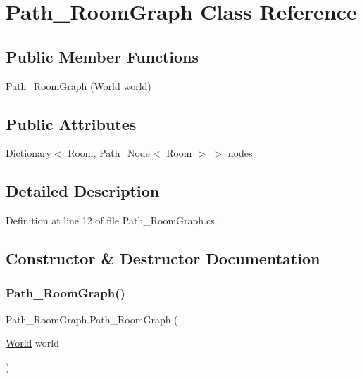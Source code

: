 \hypertarget{class_path___room_graph}{}\section{Path\+\_\+\+Room\+Graph Class Reference}
\label{class_path___room_graph}
\subsection*{Public Member Functions}
\begin{DoxyCompactItemize}
\item 
\hyperlink{class_path___room_graph_a5e5d542d2211abeea351cf51f59a0881}{Path\+\_\+\+Room\+Graph} (\hyperlink{class_world}{World} world)
\end{DoxyCompactItemize}
\subsection*{Public Attributes}
\begin{DoxyCompactItemize}
\item 
Dictionary$<$ \hyperlink{class_project_porcupine_1_1_rooms_1_1_room}{Room}, \hyperlink{class_path___node}{Path\+\_\+\+Node}$<$ \hyperlink{class_project_porcupine_1_1_rooms_1_1_room}{Room} $>$ $>$ \hyperlink{class_path___room_graph_a45a24066fd1d3d31bc1f62053aa62fc1}{nodes}
\end{DoxyCompactItemize}


\subsection{Detailed Description}


Definition at line 12 of file Path\+\_\+\+Room\+Graph.\+cs.



\subsection{Constructor \& Destructor Documentation}
\mbox{\label{class_path___room_graph_a5e5d542d2211abeea351cf51f59a0881}} 
\subsubsection{\texorpdfstring{Path\+\_\+\+Room\+Graph()}{Path\_RoomGraph()}}
{\footnotesize\ttfamily Path\+\_\+\+Room\+Graph.\+Path\+\_\+\+Room\+Graph (\begin{DoxyParamCaption}\item[{\hyperlink{class_world}{World}}]{world }\end{DoxyParamCaption})}



